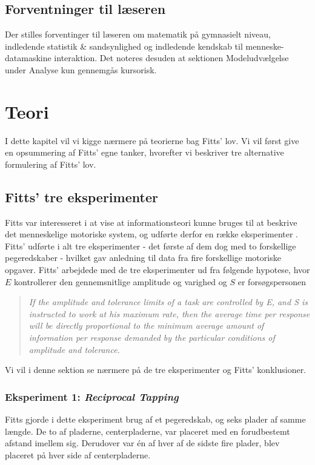 \section*{Forventninger til læseren}
Der stilles forventinger til læseren om matematik på gymnasielt niveau, indledende statistik \& sandsynlighed og indledende kendskab til menneske-datamaskine interaktion. Det noteres desuden at sektionen Modeludvælgelse under Analyse kun gennemgås kursorisk.

\chapter*{Teori}
I dette kapitel vil vi kigge nærmere på teorierne bag Fitts' lov. Vi vil først give en opsummering af Fitts' egne tanker, hvorefter vi beskriver tre alternative formulering af Fitts' lov.

\section*{Fitts' tre eksperimenter}
Fitts var interesseret i at vise at informationsteori kunne bruges til at beskrive det menneskelige motoriske system, og udførte derfor en række eksperimenter \cite{fitts1954}. Fitts' udførte i alt tre eksperimenter - det første af dem dog med to forskellige pegeredskaber - hvilket gav anledning til data fra fire forskellige motoriske opgaver. Fitts' arbejdede med de tre eksperimenter ud fra følgende hypotese, hvor $E$ kontrollerer den gennemsnitlige amplitude og varighed \cite{fitts1954} og $S$ er forsøgspersonen
\begin{quotation}
\textit{If the amplitude and tolerance limits of a task are controlled by E, and S is instructed to work at his maximum rate, then the average time per response will be directly proportional to the minimum average amount of information per response demanded by the particular conditions of amplitude and tolerance. \cite{fitts1954}}
\end{quotation}
Vi vil i denne sektion se nærmere på de tre eksperimenter og Fitts' konklusioner.

\subsection*{Eksperiment 1: \textit{Reciprocal Tapping}}
Fitts gjorde i dette eksperiment brug af et pegeredskab, og seks plader af samme længde. De to af pladerne, centerpladerne, var placeret med en forudbestemt afstand imellem sig. Derudover var én af hver af de sidste fire plader, blev placeret på hver side af centerpladerne.

